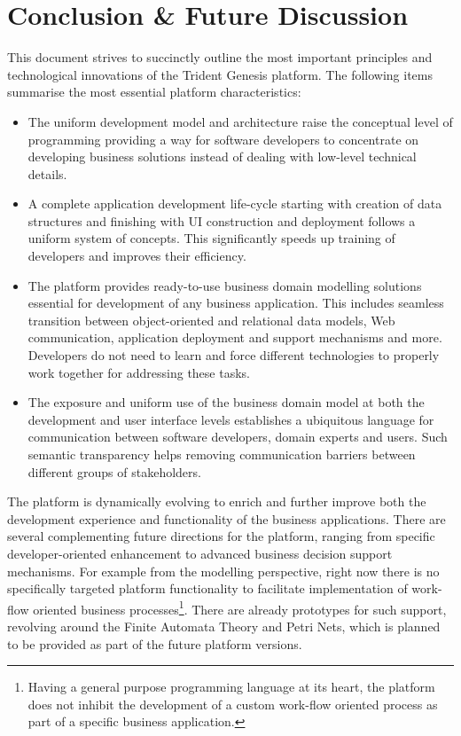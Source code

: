 \section{Conclusion \& Future Discussion}\label{sec:08}

  This document strives to succinctly outline the most important principles and technological innovations of the Trident Genesis platform.
  The following items summarise the most essential platform characteristics: 
  \begin{itemize}
    \item The uniform development model and architecture raise the conceptual level of programming providing a way for software developers to concentrate on developing business solutions instead of dealing with low-level technical details.
    \item A complete application development life-cycle starting with creation of data structures and finishing with UI construction and deployment follows a uniform system of concepts.
	This significantly speeds up training of developers and improves their efficiency.
    \item The platform provides ready-to-use business domain modelling solutions essential for development of any business application.
	  This includes seamless transition between object-oriented and relational data models, Web communication, application deployment and support mechanisms and more.
	  Developers do not need to learn and force different technologies to properly work together for addressing these tasks.
    \item The exposure and uniform use of the business domain model at both the development and user interface levels establishes a ubiquitous language for communication between software developers, domain experts and users.
	  Such semantic transparency helps removing communication barriers between different groups of stakeholders.
  \end{itemize}

  The platform is dynamically evolving to enrich and further improve both the development experience and functionality of the business applications.
  There are several complementing future directions for the platform, ranging from specific developer-oriented enhancement to advanced business decision support mechanisms.
  For example from the modelling perspective, right now there is no specifically targeted platform functionality to facilitate implementation of work-flow oriented business processes\footnote{Having a general purpose programming language at its heart, the platform does not inhibit the development of a custom work-flow oriented process as part of a specific business application.}.
  There are already prototypes for such support, revolving around the Finite Automata Theory and Petri Nets, which is planned to be provided as part of the future platform versions.
  
